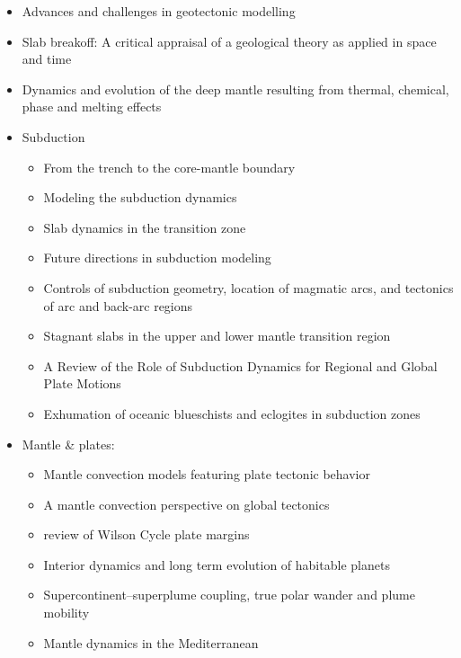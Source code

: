 \begin{itemize}
\item Advances and challenges in geotectonic modelling \cite{bufy14}
\item Slab breakoff: A critical appraisal of a geological theory as applied in space and time \cite{garm18}
\item Dynamics and evolution of the deep mantle resulting from thermal, chemical, phase and melting effects \cite{tack12}

\item Subduction
   \begin{itemize}
   \item From the trench to the core-mantle boundary \cite{kinc95}
   \item Modeling the subduction dynamics \cite{bill08}
   \item Slab dynamics in the transition zone \cite{bill10}
   \item Future directions in subduction modeling \cite{gery11}
   \item Controls of subduction geometry, location of magmatic arcs, 
         and tectonics of arc and back-arc regions \cite{crpi82}
   \item Stagnant slabs in the upper and lower mantle transition region \cite{fuwo01}
   \item A Review of the Role of Subduction Dynamics for Regional and Global Plate Motions \cite{befa09}
   \item Exhumation of oceanic blueschists and eclogites in subduction zones \cite{agyj09}
   \end{itemize}

\item Mantle \& plates:
   \begin{itemize}
   \item Mantle convection models featuring plate tectonic behavior \cite{lowm11}
   \item A mantle convection perspective on global tectonics \cite{cogu17}
   \item review of Wilson Cycle plate margins \cite{buto14}
   \item Interior dynamics and long term evolution of habitable planets \cite{taab12}
   \item Supercontinent–superplume coupling, true polar wander and plume mobility \cite{lizh09}
   \item Mantle dynamics in the Mediterranean \cite{faba14}
   \end{itemize}


\end{itemize}
